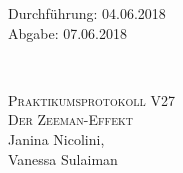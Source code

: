 



\begin{titlepage}
  \begin{flushleft}
 Durchführung: 04.06.2018\\
 Abgabe: 07.06.2018
  \end{flushleft}


\HRule\\[1,0cm]

 \begin{center}


\textsc{\LARGE Praktikumsprotokoll V27}\\[1.5cm]
\textsc{\huge Der Zeeman-Effekt} \\[5,5cm]

Janina Nicolini\footnotemark[1], \\
Vanessa Sulaiman\footnotemark[2] \\[1,0cm]



 \end{center}
\HRule

 \vfill

\end{titlepage}






\printbibliography


